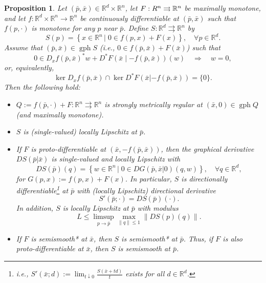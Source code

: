 \documentclass[reqno]{amsart}
\newtheorem{proposition}{Proposition}[section]
\numberwithin{equation}{section}
\newcommand{\R}{\mathbb{R}}
\newcommand{\gph}{\operatorname{gph}}
\newcommand{\set}[2]{\left\{#1\,\left\vert\; #2\right.\right\}}
\begin{document}


\begin{proposition}\label{prop:Implicit} Let $(\bar p,\bar x)\in \R^d\times \R^n$, let  $F:\mathbb \R^n\rightrightarrows \R^n$ be maximally  monotone, and  let $f:\R^d\times \R^n\to \R^n$  be continuously differentiable at $(\bar p, \bar x)$ such that $f(p,\cdot)$ is  monotone for any $p$ near $\bar p$. Define $S:\R^d\rightrightarrows\R^n$ by 
\[
S(p)=\set{x\in \R^n}{0\in f(p,x)+F(x)}, \quad \forall p \in \mathbb{R}^d.
\]
Assume that  $(\bar p,\bar x)\in \gph S$  (i.e., $0\in f(\bar p,\bar x)+F(\bar x)$) such that
\begin{equation}\label{eq:MordCrit}
   0\in D_x f(\bar p,\bar x)^*w+D^*F(\bar x\mid -f(\bar p,\bar x))(w)\quad\Longrightarrow \quad w=0,
\end{equation}
or, equivalently, 
\begin{equation}\label{eq:KernelCQ}
\ker D_xf(\bar p,\bar x) \cap \ker D^*F(\bar x|-f(\bar p,\bar x))=\{0\}.
\end{equation}
Then the following hold:
\begin{itemize}
    \item[(a)]  $Q:=f(\bar p,\cdot)+F:\R^n\rightrightarrows \R^n$ is  {\em strongly metrically regular} at $(\bar x,0) \in \gph Q$ (and maximally monotone).
    \item[(b)]   $S$ is (single-valued) locally Lipschitz at $\bar p$. 
    \item[(c)] If $F$ is {\em proto-differentiable}  at $(\bar x, -f(\bar p,\bar x))$, then  the graphical derivative $DS(\bar p|\bar x)$ is single-valued and locally  Lipschitz with 
    \begin{equation}
    \label{eq:graphical_derivative}
     DS(\bar p)(q)=\set{w \in \mathbb{R}^n}{0\in DG(\bar p,\bar x|0)(q,w)}, \quad \forall q \in \mathbb{R}^d,
    \end{equation}
    for $G(p,x):=f(p,x)+F(x)$.
    In particular, $S$ is directionally differentiable\footnote{i.e., $S'(\bar x;d):=\lim_{t\downarrow 0}\frac{S(\bar x+td)}{t}$ exists for all $d\in \R^d$.} at $\bar p$ with (locally Lipschitz) directional derivative
    \[
    S'(\bar p;\cdot)=DS(\bar p)(\cdot).
    \]
    In addition,  $S$ is locally Lipschitz at $\bar p$ with  modulus
    \[
    L\leq\limsup_{p\to \bar p} \max_{\|q\|\leq 1} \|DS(p)(q)\|.
    \]
    \item[(d)]  If $F$ is semismooth* at $\bar x$, then $S$ is semismooth* at $\bar p$. Thus, if $F$ is also proto-differentiable at $\bar x$, then $S$ is semismooth at $\bar p$.


\end{itemize}
\end{proposition}
\end{document}
